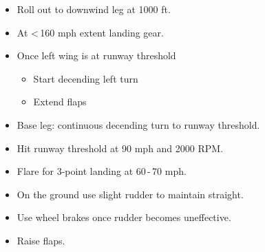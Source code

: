 \documentclass[a4paper,12pt,dvipsnames]{letter}
\begin{document}
{\begin{itemize}
 \item Roll out to downwind leg at 1000 ft.
 \item At <\,160 mph extent landing gear.
 \item Once left wing is at runway threshold
 \begin{itemize}
   \item Start decending left turn
   \item Extend flaps
 \end{itemize} 
 \item Base leg: continuous decending turn to runway threshold.
 \item Hit runway threshold at 90 mph and 2000 RPM.
 \item Flare for 3-point landing at 60\,-\,70 mph.
 \item On the ground use slight rudder to maintain straight.
 \item Use wheel brakes once rudder becomes uneffective.
 \item Raise flaps.
\end{itemize}
}
\end{document}
